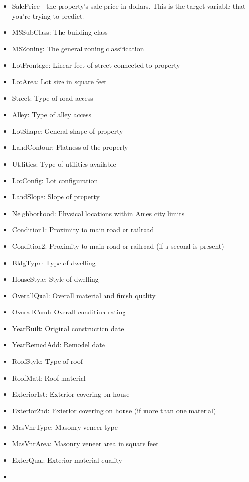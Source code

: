 \documentclass[11pt, a4paper , landscape]{article}
\providecommand{\tightlist}{%
      \setlength{\itemsep}{0pt}\setlength{\parskip}{0pt}}
\begin{document}
\begin{itemize}
\tightlist
\item
  SalePrice - the property's sale price in dollars. This is the target
  variable that you're trying to predict.
\item
  MSSubClass: The building class
\item
  MSZoning: The general zoning classification
\item
  LotFrontage: Linear feet of street connected to property
\item
  LotArea: Lot size in square feet
\item
  Street: Type of road access
\item
  Alley: Type of alley access
\item
  LotShape: General shape of property
\item
  LandContour: Flatness of the property
\item
  Utilities: Type of utilities available
\item
  LotConfig: Lot configuration
\item
  LandSlope: Slope of property
\item
  Neighborhood: Physical locations within Ames city limits
\item
  Condition1: Proximity to main road or railroad
\item
  Condition2: Proximity to main road or railroad (if a second is
  present)
\item
  BldgType: Type of dwelling
\item
  HouseStyle: Style of dwelling
\item
  OverallQual: Overall material and finish quality
\item
  OverallCond: Overall condition rating
\item
  YearBuilt: Original construction date
\item
  YearRemodAdd: Remodel date
\item
  RoofStyle: Type of roof
\item
  RoofMatl: Roof material
\item
  Exterior1st: Exterior covering on house
\item
  Exterior2nd: Exterior covering on house (if more than one material)
\item
  MasVnrType: Masonry veneer type
\item
  MasVnrArea: Masonry veneer area in square feet
\item
  ExterQual: Exterior material quality
\item

\end{itemize}
\end{document}
